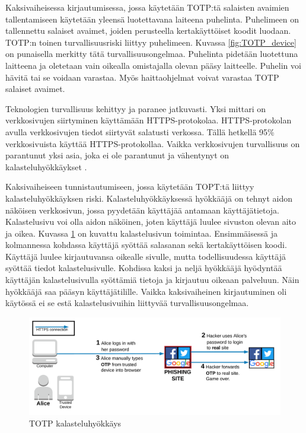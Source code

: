 Kaksivaiheisessa kirjautumisessa, jossa käytetään TOTP:tä salaisten avaimien tallentamiseen käytetään yleensä luotettavana laiteena puhelinta. Puhelimeen on tallennettu salaiset avaimet, joiden perusteella kertakäyttöiset koodit luodaan. TOTP:n toinen turvallisuusriski liittyy puhelimeen. Kuvassa \ref{fig:TOTP_device} on punaisella merkitty tätä turvallisuusongelmaa. Puhelinta pidetään luotettuna laitteena ja oletetaan vain oikealla omistajalla olevan pääsy laitteelle. Puhelin voi hävitä tai se voidaan varastaa. Myös haittaohjelmat voivat varastaa TOTP salaiset avaimet.

Teknologien turvallisuus kehittyy ja paranee jatkuvasti. Yksi mittari on verkkosivujen siirtyminen käyttämään HTTPS-protokolaa. HTTPS-protokolan avulla verkkosivujen tiedot siirtyvät salatusti verkossa. Tällä hetkellä 95\% verkkosivuista käyttää HTTPS-protokollaa. Vaikka verkkosivujen turvallisuus on parantunut yksi asia, joka ei ole parantunut ja vähentynyt on kalasteluhyökkäykset \citep{google_transparency_report} \citep{phishing_scams}.

Kaksivaiheiseen tunnistautumiseen, jossa käytetään TOPT:tä liittyy kalasteluhyökkäyksen riski. Kalasteluhyökkäyksessä hyökkääjä on tehnyt aidon näköisen verkkosivun, jossa pyydetään käyttäjää antamaan käyttäjätietoja. Kalastelusivu voi olla aidon näköinen, joten käyttäjä luulee sivuston olevan aito ja oikea. Kuvassa \ref{fig:TOTP_phishing} on kuvattu kalastelusivun toimintaa. Ensimmäisessä ja kolmannessa kohdassa käyttäjä syöttää salasanan sekä kertakäyttöisen koodi. Käyttäjä luulee kirjautuvansa oikealle sivulle, mutta todellisuudessa käyttäjä syöttää tiedot kalastelusivulle. Kohdissa kaksi ja neljä hyökkääjä hyödyntää käyttäjän kalastelusivulla syöttämiä tietoja ja kirjautuu oikeaan palveluun. Näin hyökkääjä saa pääsyn käyttäjätilille. Vaikka kaksivaiheinen kirjautuminen oli käytössä ei se estä kalastelusivuihin liittyvää turvallisuusongelmaa.

\begin{figure}[ht]
    \centering
    \includegraphics[width=15cm]{template/figures/totp phishing attack.png}
    \caption{TOTP kalasteluhyökkäys \citep{TOTP}}
    \label{fig:TOTP_phishing}
\end{figure}

